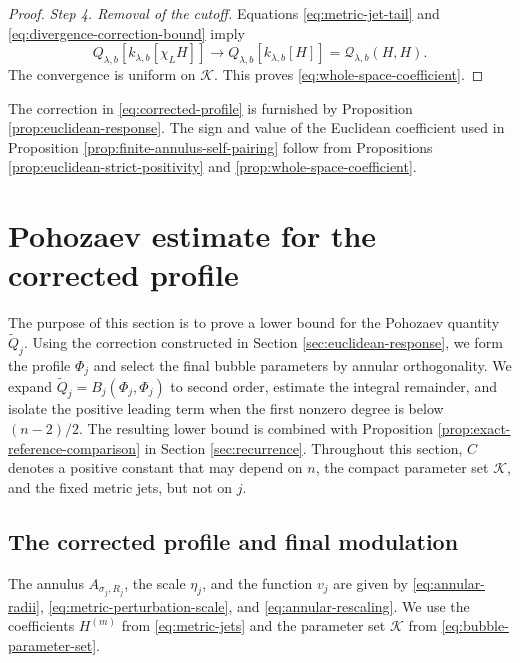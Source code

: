 \documentclass[11pt]{article}
\numberwithin{equation}{section}
\theoremstyle{remark}
\begin{document}
\begin{proof}
\emph{Step 4. Removal of the cutoff.}
Equations  \eqref{eq:metric-jet-tail} and
\eqref{eq:divergence-correction-bound} imply
 {
\[
  Q_{\lambda,b}[k_{\lambda,b}[\chi_LH]]
 \to Q_{\lambda,b}[k_{\lambda,b}[H]]
 =\mathcal Q_{\lambda,b}(H,H).
\]
}
The convergence is uniform on \(\mathcal K\). This proves
\eqref{eq:whole-space-coefficient}.
\end{proof}

{The correction in \eqref{eq:corrected-profile} is furnished by
Proposition  \ref{prop:euclidean-response}. The sign and value of the
Euclidean coefficient used in
Proposition  \ref{prop:finite-annulus-self-pairing} follow from Propositions
\ref{prop:euclidean-strict-positivity} and
\ref{prop:whole-space-coefficient}.}


\section{Pohozaev estimate for the corrected profile}
\label{sec:reference-lower-bound}

{
The purpose of this section is to prove a lower bound for the Pohozaev quantity
\(\widetilde Q_j\). Using the correction constructed in
Section  \ref{sec:euclidean-response}, we form the profile \(\Phi_j\) and select
the final bubble parameters by annular orthogonality. We expand
\(\widetilde Q_j=B_j(\Phi_j,\Phi_j)\) to second order, estimate the
integral remainder, and isolate the positive leading term when the first
nonzero degree is below \((n-2)/2\). The resulting lower bound is combined
with Proposition  \ref{prop:exact-reference-comparison} in
Section  \ref{sec:recurrence}.
}
{Throughout this section, \(C\) denotes a positive constant that
may depend on \(n\), the compact parameter set \(\mathcal K\), and the fixed
metric jets, but not on \(j\).}

\subsection{The corrected profile and final modulation}

The annulus \(A_{\sigma_j,R_j}\), the scale \(\eta_j\), and the function
\(v_j\) are given by \eqref{eq:annular-radii},
\eqref{eq:metric-perturbation-scale}, and \eqref{eq:annular-rescaling}.
We use the coefficients \(H^{(m)}\) from \eqref{eq:metric-jets} and the
parameter set \(\mathcal K\) from \eqref{eq:bubble-parameter-set}.
\end{document}
